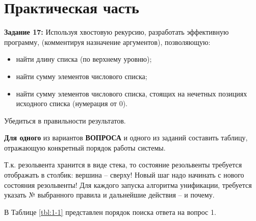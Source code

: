 \chapter{Практическая часть}

\textbf{Задание 17:} Используя хвостовую рекурсию, разработать эффективную программу, (комментируя назначение аргументов), позволяющую:
\begin{itemize}
    \item найти длину списка (по верхнему уровню);
    \item найти сумму элементов числового списка;
    \item найти сумму элементов числового списка, стоящих на нечетных позициях исходного списка (нумерация от 0).
\end{itemize}

Убедиться в правильности результатов.

\textbf{Для одного} из вариантов \textbf{ВОПРОСА} и одного из заданий составить таблицу, отражающую конкретный порядок работы системы.

Т.к. резольвента хранится в виде стека, то состояние резольвенты требуется отображать в столбик: вершина – сверху! Новый шаг надо начинать с нового состояния резольвенты! Для каждого запуска алгоритма унификации, требуется указать № выбранного правила и дальнейшие действия – и почему.

\clearpage


В Таблице \ref{tbl:1-1} представлен порядок поиска ответа на вопрос 1.

